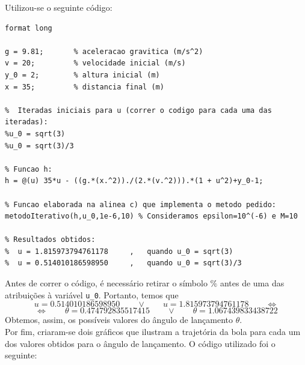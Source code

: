 \documentclass[12pt,a4paper]{article}
\begin{document}
\noindent Utilizou-se o seguinte código:
\begin{lstlisting}
format long

g = 9.81;       % aceleracao gravitica (m/s^2)
v = 20;         % velocidade inicial (m/s)
y_0 = 2;        % altura inicial (m)
x = 35;         % distancia final (m)

%  Iteradas iniciais para u (correr o codigo para cada uma das iteradas):
%u_0 = sqrt(3)
%u_0 = sqrt(3)/3

% Funcao h:
h = @(u) 35*u - ((g.*(x.^2))./(2.*(v.^2))).*(1 + u^2)+y_0-1;

% Funcao elaborada na alinea c) que implementa o metodo pedido:
metodoIterativo(h,u_0,1e-6,10) % Consideramos epsilon=10^(-6) e M=10

% Resultados obtidos:
%  u = 1.815973794761178     ,   quando u_0 = sqrt(3)
%  u = 0.514010186598950     ,   quando u_0 = sqrt(3)/3
    \end{lstlisting}

\noindent Antes de correr o código, é necessário retirar o símbolo \(\%\) antes de uma das atribuições à variável \texttt{u\_0}. Portanto, temos que\\[-10pt]
\[
    u=0.514010186598950 \qquad \vee \qquad u=1.815973794761178 \qquad \Leftrightarrow
\]
\[
    \Leftrightarrow \qquad \theta=0.474792835517415 \qquad \vee \qquad \theta=1.067439833438722
\]
Obtemos, assim, os possíveis valores do ângulo de lançamento $\theta$.\\
Por fim, criaram-se dois gráficos que ilustram a trajetória da bola para cada um dos valores obtidos para o ângulo de lançamento. O código utilizado foi o seguinte:
\end{document}
